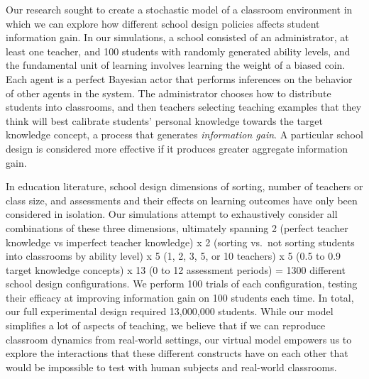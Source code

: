 \documentclass[10pt, letterpaper]{apa6}
\begin{document}
Our research sought to create a stochastic model of a classroom
environment in which we can explore how different school design policies
affects student information gain. In our simulations, a school consisted
of an administrator, at least one teacher, and 100 students with
randomly generated ability levels, and the fundamental unit of learning
involves learning the weight of a biased coin. Each agent is a perfect
Bayesian actor that performs inferences on the behavior of other agents
in the system. The administrator chooses how to distribute students into
classrooms, and then teachers selecting teaching examples that they
think will best calibrate students' personal knowledge towards the
target knowledge concept, a process that generates \emph{information
gain}. A particular school design is considered more effective if it
produces greater aggregate information gain.

In education literature, school design dimensions of sorting, number of
teachers or class size, and assessments and their effects on learning
outcomes have only been considered in isolation. Our simulations attempt
to exhaustively consider all combinations of these three dimensions,
ultimately spanning 2 (perfect teacher knowledge vs imperfect teacher
knowledge) x 2 (sorting vs.~not sorting students into classrooms by
ability level) x 5 (1, 2, 3, 5, or 10 teachers) x 5 (0.5 to 0.9 target
knowledge concepts) x 13 (0 to 12 assessment periods) = 1300 different
school design configurations. We perform 100 trials of each
configuration, testing their efficacy at improving information gain on
100 students each time. In total, our full experimental design required
13,000,000 students. While our model simplifies a lot of aspects of
teaching, we believe that if we can reproduce classroom dynamics from
real-world settings, our virtual model empowers us to explore the
interactions that these different constructs have on each other that
would be impossible to test with human subjects and real-world
classrooms.
\end{document}
